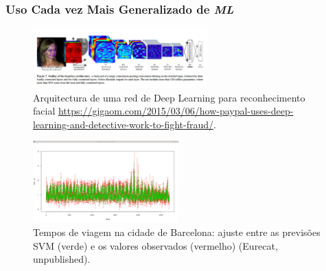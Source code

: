 \documentclass[hyperref={pdfpagelabels=true}]{beamer}
\begin{document}
\begin{frame}
\frametitle{Uso Cada vez Mais Generalizado de \textit{ML}}
    \begin{figure}   
         \includegraphics[width=0.6\textwidth]{deep.png}
         \caption{Arquitectura de uma red de Deep Learning para reconhecimento facial \url{https://gigaom.com/2015/03/06/how-paypal-uses-deep-learning-and-detective-work-to-fight-fraud/}.}%
    \end{figure} 
    
    \begin{figure}   
        \includegraphics[width=0.5\textwidth]{prediction.png}
        \caption{Tempos de viagem na cidade de Barcelona: ajuste entre as previs\~{o}es SVM (verde) e os valores observados (vermelho) (Eurecat, unpublished).}
    \end{figure} 
    
\end{frame}


          
\end{document}
